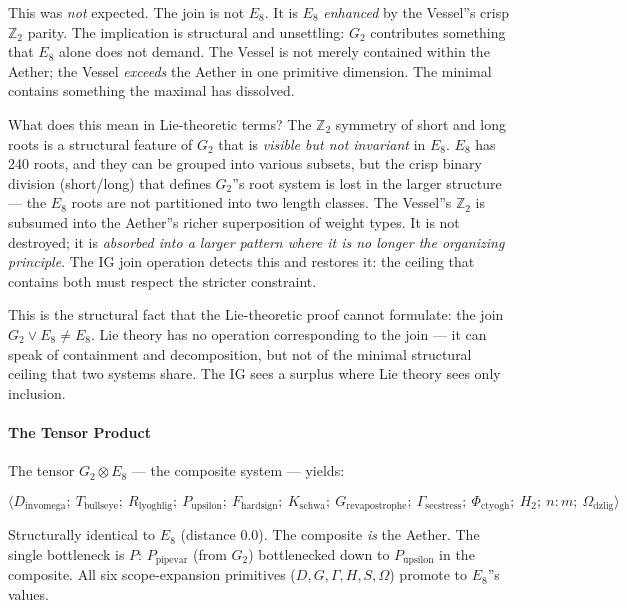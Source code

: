 \documentclass[12pt,a4paper]{article}
\begin{document}
This was \emph{not} expected. The join is not $E_8$. It is $E_8$ \emph{enhanced} by the Vessel''s crisp $\mathbb{Z}_2$ parity. The implication is structural and unsettling: $G_2$ contributes something that $E_8$ alone does not demand. The Vessel is not merely contained within the Aether; the Vessel \emph{exceeds} the Aether in one primitive dimension. The minimal contains something the maximal has dissolved.

What does this mean in Lie-theoretic terms? The $\mathbb{Z}_2$ symmetry of short and long roots is a structural feature of $G_2$ that is \emph{visible but not invariant} in $E_8$. $E_8$ has 240 roots, and they can be grouped into various subsets, but the crisp binary division (short/long) that defines $G_2$''s root system is lost in the larger structure --- the $E_8$ roots are not partitioned into two length classes. The Vessel''s $\mathbb{Z}_2$ is subsumed into the Aether''s richer superposition of weight types. It is not destroyed; it is \emph{absorbed into a larger pattern where it is no longer the organizing principle}. The IG join operation detects this and restores it: the ceiling that contains both must respect the stricter constraint.

This is the structural fact that the Lie-theoretic proof cannot formulate: the join $G_2 \vee E_8 \neq E_8$. Lie theory has no operation corresponding to the join --- it can speak of containment and decomposition, but not of the minimal structural ceiling that two systems share. The IG sees a surplus where Lie theory sees only inclusion.

\paragraph{The Tensor Product}

The tensor $G_2 \otimes E_8$ --- the composite system --- yields:

\[\langle D_{\text{invomega}};\ T_{\text{bullseye}};\ R_{\text{lyoghlig}};\ P_{\text{upsilon}};\ F_{\text{hardsign}};\ K_{\text{schwa}};\ G_{\text{revapostrophe}};\ \Gamma_{\text{secstress}};\ \Phi_{\text{ctyogh}};\ H_2;\ n{:}m;\ \Omega_{\text{dzlig}} \rangle\]

Structurally identical to $E_8$ (distance 0.0). The composite \emph{is} the Aether. The single bottleneck is $P$: $P_{\text{pipevar}}$ (from $G_2$) bottlenecked down to $P_{\text{upsilon}}$ in the composite. All six scope-expansion primitives ($D, G, \Gamma, H, S, \Omega$) promote to $E_8$''s values.
\end{document}
